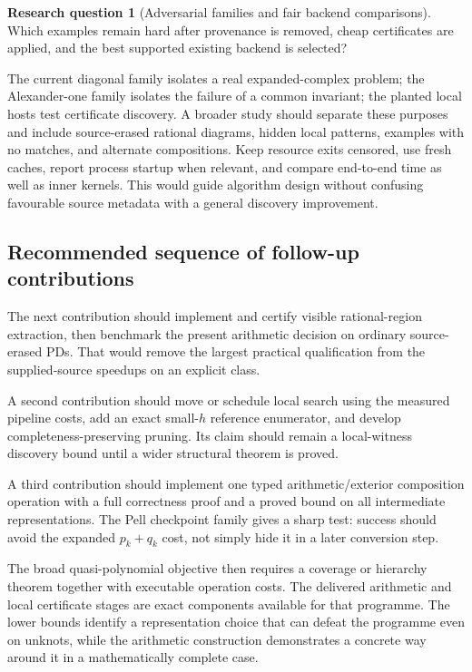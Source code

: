 \documentclass[11pt,a4paper]{article}
\theoremstyle{definition}
\newtheorem{researchquestion}{Research question}
\theoremstyle{remark}
\numberwithin{equation}{section}
\begin{document}
\begin{researchquestion}[Adversarial families and fair backend comparisons]
Which examples remain hard after provenance is removed, cheap certificates
are applied, and the best supported existing backend is selected?
\end{researchquestion}
The current diagonal family isolates a real expanded-complex problem;
the Alexander-one family isolates the failure of a common invariant;
the planted local hosts test certificate discovery. A broader study should
separate these purposes and include source-erased rational diagrams,
hidden local patterns, examples with no matches, and alternate compositions.
Keep resource exits censored, use fresh caches, report process startup
when relevant, and compare end-to-end time as well as inner kernels.
This would guide algorithm design without confusing favourable source
metadata with a general discovery improvement.

\subsection{Recommended sequence of follow-up contributions}

The next contribution should implement and certify visible rational-region
extraction, then benchmark the present arithmetic decision on ordinary
source-erased PDs. That would remove the largest practical qualification
from the supplied-source speedups on an explicit class.

A second contribution should move or schedule local search using the
measured pipeline costs, add an exact small-\(h\) reference enumerator,
and develop completeness-preserving pruning. Its claim should remain a
local-witness discovery bound until a wider structural theorem is proved.

A third contribution should implement one typed arithmetic/exterior
composition operation with a full correctness proof and a proved bound on
all intermediate representations. The Pell checkpoint family gives a sharp
test: success should avoid the expanded \(p_k+q_k\) cost, not simply hide
it in a later conversion step.

The broad quasi-polynomial objective then requires a coverage or hierarchy
theorem together with executable operation costs. The delivered arithmetic
and local certificate stages are exact components available for that
programme. The lower bounds identify a representation choice that can
defeat the programme even on unknots, while the arithmetic construction
demonstrates a concrete way around it in a mathematically complete case.
\end{document}
